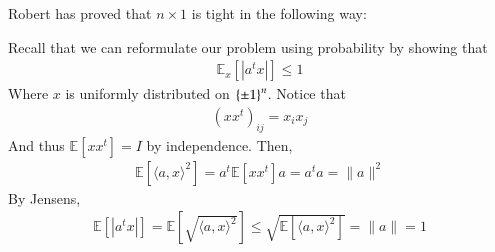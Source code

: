 \documentclass[12pt]{article}
\theoremstyle{definitionstyle}
\newcommand{\mg}[1]{\| #1 \|}
\renewcommand{\ip}[1]{\langle#1\rangle}
\newcommand{\SET}[1]{\Set{\mskip-\medmuskip #1 \mskip-\medmuskip}}
\newcommand{\E}{\mathbb E}
\begin{document}
    Robert has proved that $n \times 1$ is tight in the following way:

    Recall that we can reformulate our problem using probability by showing that 
    \begin{align*}
        \E_x[|a^t x|] \leq 1
    \end{align*}
    Where $x$ is uniformly distributed on $\SET{\pm 1}^n$. Notice that 
    \begin{align*}
        (xx^t)_{ij} = x_i x_j
    \end{align*}
    And thus $\E[xx^t] = I$ by independence. Then,
    \begin{align*}
        \E[\ip{a,x}^2] = a^t \E[xx^t] a = a^t a = \mg{a}^2
    \end{align*}
    By Jensens,
    \begin{align*}
        \E[|a^t x|] = \E[\sqrt{\ip{a,x}^2}] \leq \sqrt{\E[\ip{a,x}^2]} = \mg{a} = 1
    \end{align*}
\end{document}
